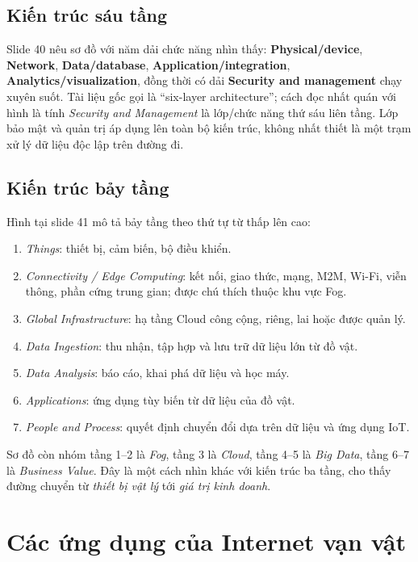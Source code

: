 \subsection{Kiến trúc sáu tầng}
Slide 40 nêu sơ đồ với năm dải chức năng nhìn thấy: \textbf{Physical/device}, \textbf{Network}, \textbf{Data/database}, \textbf{Application/integration}, \textbf{Analytics/visualization}, đồng thời có dải \textbf{Security and management} chạy xuyên suốt. Tài liệu gốc gọi là ``six-layer architecture''; cách đọc nhất quán với hình là tính \emph{Security and Management} là lớp/chức năng thứ sáu liên tầng. Lớp bảo mật và quản trị áp dụng lên toàn bộ kiến trúc, không nhất thiết là một trạm xử lý dữ liệu độc lập trên đường đi.

\subsection{Kiến trúc bảy tầng}
Hình tại slide 41 mô tả bảy tầng theo thứ tự từ thấp lên cao:
\begin{enumerate}
\item \emph{Things}: thiết bị, cảm biến, bộ điều khiển.
\item \emph{Connectivity / Edge Computing}: kết nối, giao thức, mạng, M2M, Wi-Fi, viễn thông, phần cứng trung gian; được chú thích thuộc khu vực Fog.
\item \emph{Global Infrastructure}: hạ tầng Cloud công cộng, riêng, lai hoặc được quản lý.
\item \emph{Data Ingestion}: thu nhận, tập hợp và lưu trữ dữ liệu lớn từ đồ vật.
\item \emph{Data Analysis}: báo cáo, khai phá dữ liệu và học máy.
\item \emph{Applications}: ứng dụng tùy biến từ dữ liệu của đồ vật.
\item \emph{People and Process}: quyết định chuyển đổi dựa trên dữ liệu và ứng dụng IoT.
\end{enumerate}
Sơ đồ còn nhóm tầng 1--2 là \emph{Fog}, tầng 3 là \emph{Cloud}, tầng 4--5 là \emph{Big Data}, tầng 6--7 là \emph{Business Value}. Đây là một cách nhìn khác với kiến trúc ba tầng, cho thấy đường chuyển từ \emph{thiết bị vật lý} tới \emph{giá trị kinh doanh}.

\section{Các ứng dụng của Internet vạn vật}\label{sec:applications}
